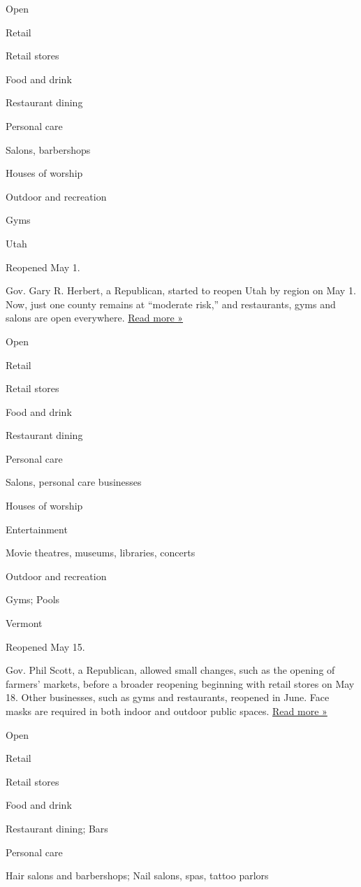 Open

Retail

Retail stores

Food and drink

Restaurant dining

Personal care

Salons, barbershops

Houses of worship

Outdoor and recreation

Gyms

Utah

Reopened May 1.

Gov. Gary R. Herbert, a Republican, started to reopen Utah by region on
May 1. Now, just one county remains at ``moderate risk,'' and
restaurants, gyms and salons are open everywhere.
\href{https://www.sltrib.com/news/2020/04/28/utah-will-begin-easing/}{Read
more »}

Open

Retail

Retail stores

Food and drink

Restaurant dining

Personal care

Salons, personal care businesses

Houses of worship

Entertainment

Movie theatres, museums, libraries, concerts

Outdoor and recreation

Gyms; Pools

Vermont

Reopened May 15.

Gov. Phil Scott, a Republican, allowed small changes, such as the
opening of farmers' markets, before a broader reopening beginning with
retail stores on May 18. Other businesses, such as gyms and restaurants,
reopened in June. Face masks are required in both indoor and outdoor
public spaces.
\href{https://vtdigger.org/2020/07/24/scott-orders-mask-mandate/}{Read
more »}

Open

Retail

Retail stores

Food and drink

Restaurant dining; Bars

Personal care

Hair salons and barbershops; Nail salons, spas, tattoo parlors

